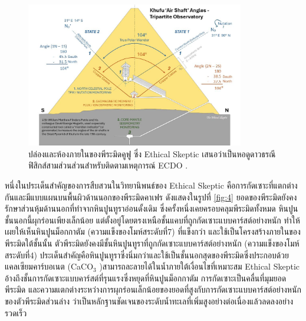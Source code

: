 \documentclass[10pt,twocolumn,letterpaper]{article}
\begin{document}
\begin{figure}[b]
\begin{center}
\includegraphics[width=0.85\textwidth]{shafts.jpg}
\end{center}
   \caption{ปล่องและห้องภายในของพีระมิดคูฟู ซึ่ง Ethical Skeptic  เสนอว่าเป็นหอดูดาวธรณีฟิสิกส์สามส่วนส่วนสำหรับติดตามเหตุการณ์ ECDO \cite{28}.}
\label{fig:5}
\end{figure}

หนึ่งในประเด็นสำคัญของการสืบสวนในวิทยานิพนธ์ของ Ethical Skeptic คือการกัดเซาะที่แตกต่างกันและมีแบบแผนบนพื้นผิวด้านนอกของพีระมิดคาเฟร ดังแสดงในรูปที่ \ref{fig:4} ยอดของพีระมิดยังคงรักษาส่วนหุ้มด้านนอกที่ทำจากหินปูนทูราอ่อนดั้งเดิม ซึ่งครั้งหนึ่งเคยครอบคลุมพีระมิดทั้งหมด  หินปูนชั้นนอกนี้ผุกร่อนเพียงเล็กน้อย แต่ตั้งอยู่โดยตรงเหนือชั้นแคบที่ถูกกัดเซาะแบบคาร์สต์อย่างหนัก ทำให้เผยให้เห็นหินปูนม็อกกาตัม (ความแข็งของโมห์สระดับที่7) ที่แข็งกว่า และใช้เป็นโครงสร้างภายในของพีระมิดใต้ชั้นนั้น ตัวพีระมิดยังคงมีชั้นหินปูนทูราที่ถูกกัดเซาะแบบคาร์สต์อย่างหนัก (ความแข็งของโมห์สระดับที่4) ประเด็นสำคัญคือหินปูนทูราซึ่งนิ่มกว่าและใช้เป็นชั้นนอกสุดของพีระมิดซึ่งประกอบด้วยแคลเซียมคาร์บอเนต (CaCO$_3$ )สามารถละลายได้ในน้ำภายใต้เงื่อนไขที่เหมาะสม Ethical Skeptic อ้างถึงชั้นการกัดเซาะแบบคาร์สต์ที่รุนแรงซึ่งหยุดที่หินปูนม็อกกาตัม การกัดเซาะเป็นคลื่นที่มุมยอดพีระมิด และความแตกต่างระหว่างการผุกร่อนเล็กน้อยของยอดที่สูงกับการกัดเซาะแบบคาร์สต์อย่างหนักของตัวพีระมิดส่วนล่าง ว่าเป็นหลักฐานชัดเจนของระดับน้ำทะเลที่เพิ่มสูงอย่างต่อเนื่องแล้วลดลงอย่างรวดเร็ว \cite{27}
\end{document}
